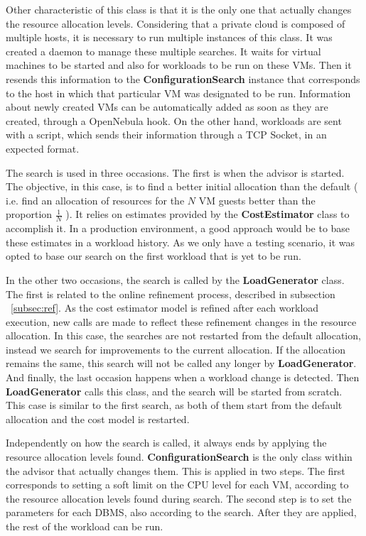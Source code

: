 Other characteristic of this class is that it is the only one that actually changes the resource allocation levels. Considering that a private cloud is composed of multiple hosts, it is necessary to run multiple instances of this class. It was created a daemon to manage these multiple searches. It waits for virtual machines to be started and also for workloads to be run on these VMs. Then it resends this information to the \textbf{ConfigurationSearch} instance that corresponds to the host in which that particular VM was designated to be run. Information about newly created VMs can be automatically added as soon as they are created, through a OpenNebula hook. On the other hand, workloads are sent with a script, which sends their information through a TCP Socket, in an expected format.

The search is used in three occasions. The first is when the advisor is started. The objective, in this case, is to find a better initial allocation than the default ( i.e. find an allocation of resources for the $N$ VM guests better than the proportion $\frac{1}{N}$ ). It relies on estimates provided by the \textbf{CostEstimator} class to accomplish it. In a production environment, a good approach would be to base these estimates in a workload history. As we only have a testing scenario, it was opted to base our search on the first workload that is yet to be run.

In the other two occasions, the search is called by the \textbf{LoadGenerator} class. The first is related to the online refinement process, described in subsection ~\ref{subsec:ref}. As the cost estimator model is refined after each workload execution, new calls are made to reflect these refinement changes in the resource allocation. In this case, the searches are not restarted from the default allocation, instead we search for improvements to the current allocation. If the allocation remains the same, this search will not be called any longer by \textbf{LoadGenerator}. And finally, the last occasion happens when a workload change is detected. Then \textbf{LoadGenerator} calls this class, and the search will be started from scratch. This case is similar to the first search, as both of them start from the default allocation and the cost model is restarted.

Independently on how the search is called, it always ends by applying the resource allocation levels found. \textbf{ConfigurationSearch} is the only class within the advisor that actually changes them. This is applied in two steps. The first corresponds to setting a soft limit on the CPU level for each VM, according to the resource allocation levels found during search. The second step is to set the parameters for each DBMS, also according to the search. After they are applied, the rest of the workload can be run.

